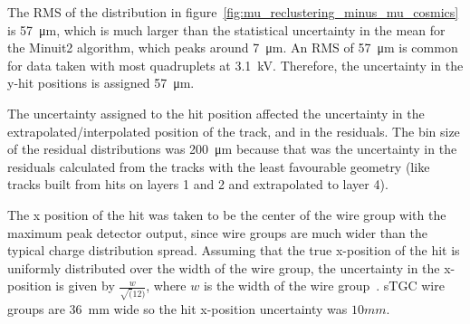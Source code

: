 The RMS of the distribution in figure~\ref{fig:mu_reclustering_minus_mu_cosmics} is \SI{57}{\micro\meter}, which is much larger than the statistical uncertainty in the mean for the Minuit2 algorithm, which peaks around \SI{7}{\micro\meter}. An RMS of \SI{57}{\micro\meter} is common for data taken with most quadruplets at 3.1~kV. Therefore, the uncertainty in the y-hit positions is assigned \SI{57}{\micro\meter}.

The uncertainty assigned to the hit position affected the uncertainty in the extrapolated/interpolated position of the track, and in the residuals. The bin size of the residual distributions was \SI{200}{\micro\meter} because that was the uncertainty in the residuals calculated from the tracks with the least favourable geometry (like tracks built from hits on layers 1 and 2 and extrapolated to layer 4). 

The x position of the hit was taken to be the center of the wire group with the maximum peak detector output, since wire groups are much wider than the typical charge distribution spread. Assuming that the true x-position of the hit is uniformly distributed over the width of the wire group, the uncertainty in the x-position is given by $\frac{w}{\sqrt(12)}$, where $w$ is the width of the wire group~\cite{Sauli:117989}. sTGC wire groups are \SI{36}{\milli\meter} wide so the hit x-position uncertainty was $10 mm$.


